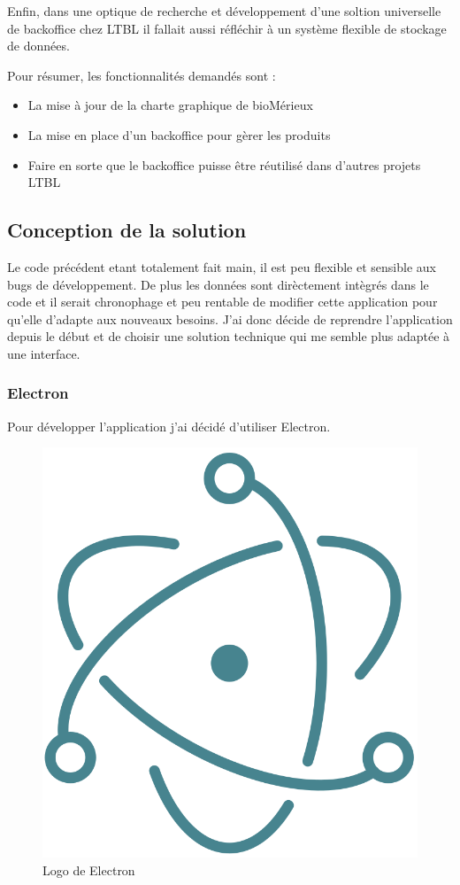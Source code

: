 Enfin, dans une optique de recherche et développement d'une soltion universelle de backoffice chez LTBL il fallait aussi réfléchir à un système flexible de stockage de données.

Pour résumer, les fonctionnalités demandés sont :

\begin{itemize}
    \item La mise à jour de la charte graphique de bioMérieux
    \item La mise en place d'un backoffice pour gèrer les produits
    \item Faire en sorte que le backoffice puisse être réutilisé dans d'autres projets LTBL
\end{itemize}


\subsection{Conception de la solution}

Le code précédent etant totalement fait main, il est peu flexible et sensible aux bugs de développement.
De plus les données sont dirèctement intègrés dans le code et il serait chronophage et peu rentable de modifier cette application pour qu'elle d'adapte aux nouveaux besoins.
J'ai donc décide de reprendre l'application depuis le début et de choisir une solution technique qui me semble plus adaptée à une interface.

\subsubsection{Electron}

Pour développer l'application j'ai décidé d'utiliser Electron.

\begin{figure}[h]
    \centering
    \includegraphics[scale=0.5]{img/electron.png}
    \caption{Logo de Electron}
\end{figure}

